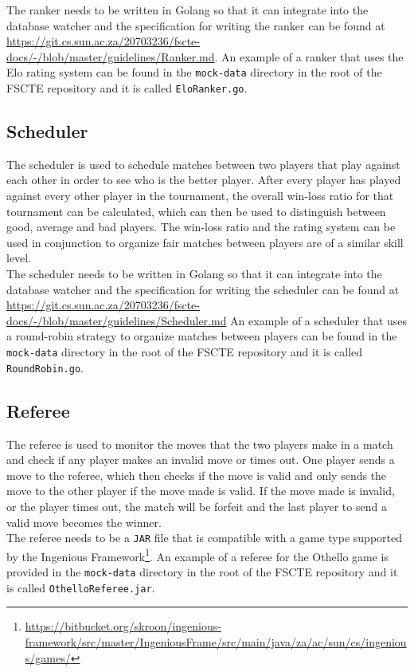 \documentclass[a4paper, 11pt]{report}
\begin{document}
The ranker needs to be written in Golang so that it can integrate into the database
watcher and the specification for writing the ranker can be found at
\url{https://git.cs.sun.ac.za/20703236/fscte-docs/-/blob/master/guidelines/Ranker.md}.
An example of a ranker that uses the Elo \cite{elo} rating system can be found in
the \texttt{mock-data} directory in the root of the FSCTE repository and it is
called \texttt{EloRanker.go}.

\subsection{Scheduler}
\label{sec:scheduler}

The scheduler is used to schedule matches between two players that play against
each other in order to see who is the better player. After every player
has played against every other player in the tournament, the overall win-loss
ratio for that tournament can be calculated, which can then be used to
distinguish between good, average and bad players. The win-loss ratio and the
rating system can be used in conjunction to organize fair matches between players
are of a similar skill level. \\

The scheduler needs to be written in Golang so that it can integrate into the
database watcher and the specification for writing the scheduler can be found at
\url{https://git.cs.sun.ac.za/20703236/fscte-docs/-/blob/master/guidelines/Scheduler.md}
An example of a scheduler that uses a round-robin strategy to organize matches
between players can be found in the \texttt{mock-data} directory in the root of
the FSCTE repository and it is called \texttt{RoundRobin.go}.

\subsection{Referee}
\label{sec:referee}

The referee is used to monitor the moves that the two players make in a match and
check if any player makes an invalid move or times out. One player sends a
move to the referee, which then checks if the move is valid and only sends
the move to the other player if the move made is valid. If the move made is
invalid, or the player times out, the match will be forfeit and the last player
to send a valid move becomes the winner. \\

The referee needs to be a \texttt{JAR} file that is compatible with a game type
supported by the Ingenious
Framework\footnote{\url{https://bitbucket.org/skroon/ingenious-framework/src/master/IngeniousFrame/src/main/java/za/ac/sun/cs/ingenious/games/}}.
An example of a referee for the Othello game is provided in the \texttt{mock-data}
directory in the root of the FSCTE repository and it is called \texttt{OthelloReferee.jar}.
\end{document}
